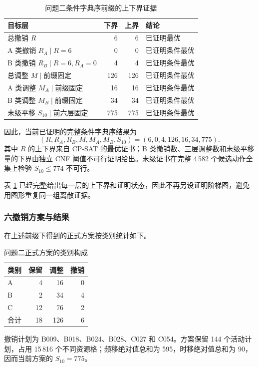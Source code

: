\begin{table}[H]
\centering
\caption{问题二条件字典序前缀的上下界证据}
\label{tab:q2-proof}
\begin{tabular}{lrrl}
\toprule
目标层 & 下界 & 上界 & 结论 \\
\midrule
总撤销 \(R\) & 6 & 6 & 已证明最优 \\
A 类撤销 \(R_A\mid R=6\) & 0 & 0 & 已证明条件最优 \\
B 类撤销 \(R_B\mid R=6,R_A=0\) & 4 & 4 & 已证明条件最优 \\
总调整 \(M\mid\text{前缀固定}\) & 126 & 126 & 已证明条件最优 \\
A 类调整 \(M_A\mid\text{前缀固定}\) & 16 & 16 & 已证明条件最优 \\
B 类调整 \(M_B\mid\text{前缀固定}\) & 34 & 34 & 已证明条件最优 \\
末级平移 \(S_{10}\mid\text{前六层固定}\) & 775 & 775 & 已证明条件最优 \\
\bottomrule
\end{tabular}
\end{table}

因此，当前已证明的完整条件字典序结果为
\[
(R,R_A,R_B,M,M_A,M_B,S_{10})=(6,0,4,126,16,34,775).
\]
其中 \(R\) 的上下界来自 CP-SAT 的最优证书；B 类撤销数、三层调整数和末级平移量的下界由独立 CNF 阈值不可行证明给出。末级证书在完整 4\,582 个候选动作全集上检验 \(S_{10}\le774\) 不可行。

表 \ref{tab:q2-proof} 已经完整给出每一层的上下界和证明状态，因此不再另设证明阶梯图，避免用图形重复同一组离散证据。

\subsubsection{六撤销方案与结果}
在上述前缀下得到的正式方案按类别统计如下。

\begin{table}[H]
\centering
\caption{问题二正式方案的类别构成}
\label{tab:q2-solution}
\begin{tabular}{lrrr}
\toprule
类别 & 保留 & 调整 & 撤销 \\
\midrule
A & 4 & 16 & 0 \\
B & 2 & 34 & 4 \\
C & 12 & 76 & 2 \\
\midrule
合计 & 18 & 126 & 6 \\
\bottomrule
\end{tabular}
\end{table}

撤销计划为 B009、B018、B024、B028、C027 和 C054。方案保留 144 个活动计划，占用 15\,816 个不同资源格；频移绝对值总和为 595，时移绝对值总和为 90，因而当前方案的 \(S_{10}=775\)。

